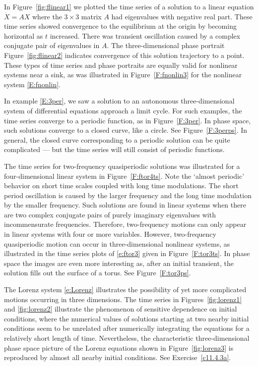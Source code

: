\documentclass{ximera}
\begin{document}
In Figure~\ref{fig:flinear1} we plotted the time series of a solution to a 
linear equation $\dot{X}=AX$ where the $3\times 3$ matrix $A$ had eigenvalues
with negative real part.  These time series showed convergence to the 
equilibrium at the origin by becoming horizontal as $t$ increased.  There was
transient oscillation caused by a complex conjugate pair of eigenvalues in 
$A$.  The three-dimensional phase portrait Figure~\ref{fig:flinear2} indicates
convergence of this solution trajectory to a point.  These types of time 
series and phase portraits are equally valid for nonlinear systems near a sink,
as was illustrated in Figure~\ref{F:fnonlin3} for the nonlinear system \eqref{E:fnonlin}.

In example \eqref{E:3per}, we saw a solution to an autonomous three-dimensional 
system of differential equations approach a limit cycle.  For such 
examples, the time series converge to a periodic function, as in 
Figure~\ref{F:3per}.  In phase space, such solutions converge to a closed 
curve, like a circle.  See Figure~\ref{F:3perps}.   In general, the closed 
curve corresponding to a periodic solution can be quite complicated --- but 
the time series will still consist of periodic functions.

The time series for two-frequency quasiperiodic solutions was illustrated for
a four-dimensional linear system in Figure~\ref{F:ftor4ts}.  Note the `almost 
periodic' behavior on short time scales coupled with long time modulations.
The short period oscillation is caused by the larger frequency and the long 
time modulation by the smaller frequency.  Such solutions are found in linear 
systems when there are two complex conjugate pairs of purely imaginary 
eigenvalues with incommensurate frequencies.  Therefore, two-frequency 
motions can only appear in linear systems with four or more variables.  
However, two-frequency quasiperiodic motion can occur in three-dimensional 
nonlinear systems, as illustrated in the time series plots of \eqref{e:ftor3} 
given in Figure~\ref{F:tor3ts}.  In phase space the images are even more 
interesting as, after an initial transient, the solution fills out the 
surface of a torus.  See Figure~\ref{F:tor3ps}.

The Lorenz system \eqref{e:Lorenz} illustrates the possibility of yet more 
complicated motions occurring in three dimensions.  The time series in 
Figures~\ref{fig:lorenz1} and \ref{fig:lorenz2} illustrate the phenomenon of 
sensitive dependence on initial conditions, where the numerical values of 
solutions starting at two nearby initial conditions seem to be unrelated 
after numerically integrating the equations for a relatively short length of 
time.  Nevertheless, the characteristic three-dimensional phase space picture 
of the Lorenz equations shown in Figure~\ref{fig:lorenz3} is reproduced by 
almost all nearby initial conditions.  See Exercise~\ref{c11.4.3a}.
 
\end{document}
